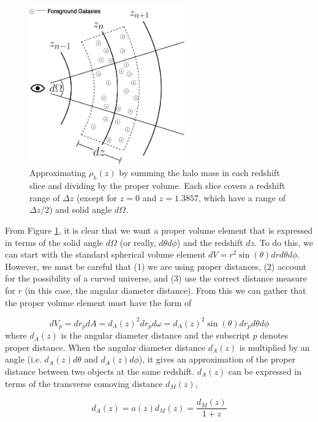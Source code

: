 \documentclass[12pt]{article}
\begin{document}
\begin{figure}[!ht]
  \centering
  \includegraphics[width=0.6\textwidth]{figs-swe/comoving_integral.png}
  \caption{Approximating $\rho_h(z)$ by summing the halo mass in each redshift slice and dividing by the proper volume. Each slice covers a redshift range of $\Delta z$ (except for $z=0$ and $z=1.3857$, which have a range of $\Delta z/2$) and solid angle $d\Omega$.}
  \label{rho_slice}
\end{figure}

From Figure \ref{rho_slice}, it is clear that we want a proper volume element that is expressed in terms of the solid angle $d\Omega$ (or really, $d\theta d\phi$) and the redshift $dz$. To do this, we can start with the standard spherical volume element $dV=r^2\sin(\theta)drd\theta d\phi$. However, we must be careful that (1) we are using proper distances, (2) account for the possibility of a curved universe, and (3) use the correct distance measure for $r$ (in this case, the angular diameter distance). From this we can gather that the proper volume element must have the form of

\begin{equation}\label{proper_element}
dV_p=dr_pdA=d_A(z)^2dr_pd\omega=d_A(z)^2\sin(\theta)dr_pd\theta d\phi
\end{equation}
where $d_A(z)$ is the angular diameter distance and the subscript $p$ denotes proper distance. When the angular diameter distance $d_A(z)$ is multiplied by an angle (i.e. $d_A(z)d\theta$ and $d_A(z)d\phi$), it gives an approximation of the proper distance between two objects at the same redshift. $d_A(z)$ can be expressed in terms of the transverse comoving distance $d_M(z)$,

\begin{equation}\label{angular2transverse}
d_A(z)=a(z)d_M(z)=\frac{d_M(z)}{1+z}
\end{equation}
\end{document}
